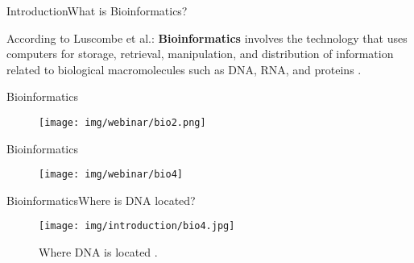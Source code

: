 \documentclass[10pt]{beamer}
\newcommand{\1}{
        	\setbeamertemplate{background}{
        		\texttt{[image: img/1]}
        		\tikz[overlay] \fill[fill opacity=0.75,fill=white] (0,0) rectangle (-\paperwidth,\paperheight);
        	}
}
\begin{document}
\begin{frame}{Introduction}{What is Bioinformatics?}
	
	According to Luscombe et al.: \textbf{Bioinformatics} involves the technology that uses computers for storage, retrieval, manipulation, and distribution of information related to biological macromolecules such as DNA, RNA, and proteins \cite{luscombe2001bioinformatics}.
	
\end{frame}


\begin{frame}{Bioinformatics}
	\begin{figure}[]
		\centering
		\texttt{[image: img/webinar/bio2.png]}
		\label{img:mot2}
	\end{figure}
\end{frame}

\begin{frame}{Bioinformatics}
	\begin{figure}[]
		\centering
		\texttt{[image: img/webinar/bio4]}
		\label{img:mot2}
	\end{figure}
\end{frame}


\begin{frame}{Bioinformatics}{Where is DNA located?}
	\begin{figure}[]
		\centering
		\texttt{[image: img/introduction/bio4.jpg]}
		\label{img:mot2}
		\caption{Where DNA is located \cite{dna2020located}.}
	\end{figure}
\end{frame}
\end{document}
